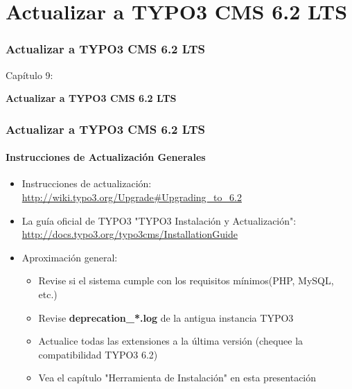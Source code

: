 %

\section{Actualizar a TYPO3 CMS 6.2 LTS}
\begin{frame}[fragile]
	\frametitle{Actualizar a TYPO3 CMS 6.2 LTS}

	\begin{center}\huge{Capítulo 9:}\end{center}
	\begin{center}\huge{\color{typo3darkgrey}\textbf{Actualizar a TYPO3 CMS 6.2 LTS}}\end{center}

\end{frame}


\begin{frame}[fragile]
	\frametitle{Actualizar a TYPO3 CMS 6.2 LTS}
	\framesubtitle{Instrucciones de Actualización Generales}

	\begin{itemize}

		\item Instrucciones de actualización:\newline
			\smaller\url{http://wiki.typo3.org/Upgrade#Upgrading_to_6.2}\normalsize
		\item La guía oficial de TYPO3 "TYPO3 Instalación y Actualización":
			\smaller\url{http://docs.typo3.org/typo3cms/InstallationGuide}\normalsize
		\item Aproximación general:
			\begin{itemize}
				\item Revise si el sistema cumple con los requisitos mínimos\small(PHP, MySQL, etc.)\normalsize
				\item Revise \textbf{deprecation\_*.log} de la antigua instancia TYPO3
				\item Actualice todas las extensiones a la última versión\newline
					\small(chequee la compatibilidad TYPO3 6.2)\normalsize
				\item Vea el capítulo "Herramienta de Instalación" en esta presentación
			\end{itemize}
	\end{itemize}

\end{frame}

